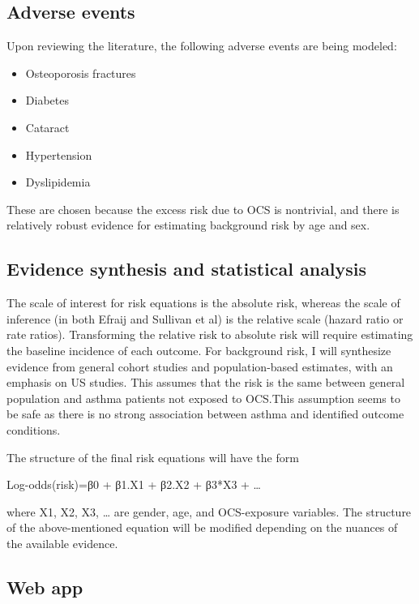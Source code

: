 \documentclass[
]{article}
\providecommand{\tightlist}{%
  \setlength{\itemsep}{0pt}\setlength{\parskip}{0pt}}
\begin{document}
\hypertarget{adverse-events}{%
\subsection{Adverse events}\label{adverse-events}}

Upon reviewing the literature, the following adverse events are being
modeled:

\begin{itemize}
\tightlist
\item
  Osteoporosis fractures
\item
  Diabetes
\item
  Cataract
\item
  Hypertension
\item
  Dyslipidemia
\end{itemize}

These are chosen because the excess risk due to OCS is nontrivial, and
there is relatively robust evidence for estimating background risk by
age and sex.

\hypertarget{evidence-synthesis-and-statistical-analysis}{%
\subsection{Evidence synthesis and statistical
analysis}\label{evidence-synthesis-and-statistical-analysis}}

The scale of interest for risk equations is the absolute risk, whereas
the scale of inference (in both Efraij and Sullivan et al) is the
relative scale (hazard ratio or rate ratios). Transforming the relative
risk to absolute risk will require estimating the baseline incidence of
each outcome. For background risk, I will synthesize evidence from
general cohort studies and population-based estimates, with an emphasis
on US studies. This assumes that the risk is the same between general
population and asthma patients not exposed to OCS.This assumption seems
to be safe as there is no strong association between asthma and
identified outcome conditions.

The structure of the final risk equations will have the form

Log-odds(risk)=β0 + β1.X1 + β2.X2 + β3*X3 + \ldots{}

where X1, X2, X3, \ldots{} are gender, age, and OCS-exposure variables.
The structure of the above-mentioned equation will be modified depending
on the nuances of the available evidence.

\hypertarget{web-app}{%
\subsection{Web app}\label{web-app}}
\end{document}
